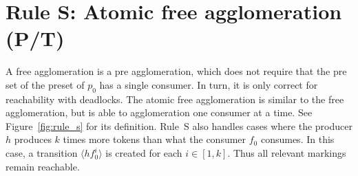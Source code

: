 \section*{Rule S: Atomic free agglomeration (P/T)}\label{sec:rule_s}
A free agglomeration is a pre agglomeration, which does not require that the pre set of the preset of $p_0$ has a single consumer.
In turn, it is only correct for reachability with deadlocks.
The atomic free agglomeration is similar to the free agglomeration, but is able to agglomeration one consumer at a time.
See Figure~\ref{fig:rule_s} for its definition.
Rule~S also handles cases where the producer $h$ produces $k$ times more tokens than what the consumer $f_0$ consumes.
In this case, a transition $\langle h f_0^i\rangle$ is created for each $i\in [1, k]$.
Thus all relevant markings remain reachable.

